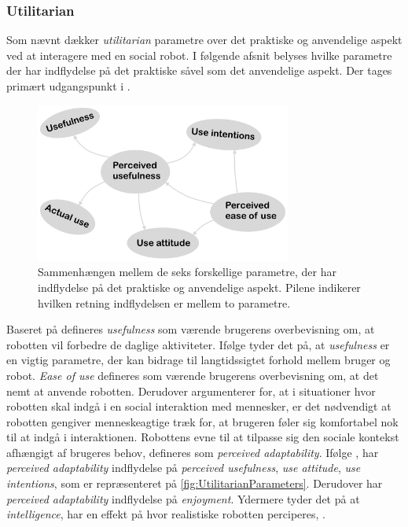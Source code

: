 \subsubsection*{Utilitarian}
\label{InteraktionSocialeRobotterParametreUtilitarian}
%
Som nævnt dækker \textit{utilitarian} parametre over det praktiske og anvendelige aspekt ved at interagere med en social robot. I følgende afsnit belyses hvilke parametre der har indflydelse på det praktiske såvel som det anvendelige aspekt. Der tages primært udgangspunkt i \textcite[s. 1477]{PDF:SharingALifeHarvey}.
%
\begin{figure}[H]
\centering
\includegraphics[width = 0.75\textwidth]{Figure/UtilitarianParameters} 
\caption{Sammenhængen mellem de seks forskellige parametre, der har indflydelse på det praktiske og anvendelige aspekt. Pilene indikerer hvilken retning indflydelsen er mellem to parametre.}
\label{fig:UtilitarianParameters}
\end{figure}
\noindent 
%
Baseret på \textcite[s. 1477]{PDF:SharingALifeHarvey} defineres \textit{usefulness} som værende brugerens overbevisning om, at robotten vil forbedre de daglige aktiviteter. Ifølge \textcite[s. 11]{PDF:SharingALifeHarvey} tyder det på, at \textit{usefulness} er en vigtig parametre, der kan bidrage til langtidssigtet forhold mellem bruger og robot. \textit{Ease of use} defineres som værende brugerens overbevisning om, at det nemt at anvende robotten. Derudover argumenterer \textcite[s. 1477]{PDF:SharingALifeHarvey} for, at i situationer hvor robotten skal indgå i en social interaktion med mennesker, er det nødvendigt at robotten gengiver menneskeagtige træk for, at brugeren føler sig komfortabel nok til at indgå i interaktionen. Robottens evne til at tilpasse sig den sociale kontekst afhængigt af brugeres behov, defineres som \textit{perceived adaptability}. Ifølge \textcite[s. 1477]{PDF:SharingALifeHarvey}, har \textit{perceived adaptability} indflydelse på \textit{perceived usefulness}, \textit{use attitude}, \textit{use intentions}, som er repræsenteret på \autoref{fig:UtilitarianParameters}. Derudover har \textit{perceived adaptability} indflydelse på \textit{enjoyment}. Ydermere tyder det på at \textit{intelligence}, har en effekt på hvor realistiske robotten perciperes, \parencite[s. 1477]{PDF:ExploringInfluencingVariable}.   
%
